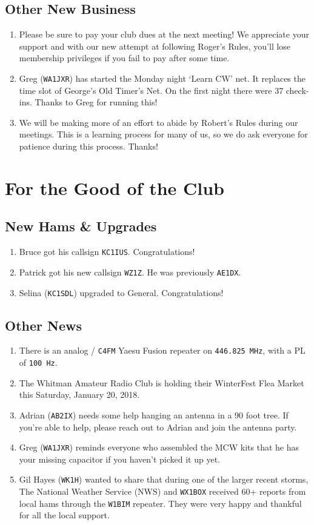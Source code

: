 \documentclass[10pt,letterpaper]{article}
\begin{document}
\subsection{Other New Business}
\begin{enumerate}
  \item Please be sure to pay your club dues at the next meeting! We appreciate your support and with our new attempt at following Roger's Rules, you'll lose membership privileges if you fail to pay after some time.
  \item Greg (\texttt{WA1JXR}) has started the Monday night `Learn CW' net. It replaces the time slot of George's Old Timer's Net. On the first night there were 37 check-ins. Thanks to Greg for running this!
  \item We will be making more of an effort to abide by Robert's Rules during our meetings. This is a learning process for many of us, so we do ask everyone for patience during this process. Thanks!
\end{enumerate}

\section{For the Good of the Club}

\subsection{New Hams \& Upgrades}
\begin{enumerate}
  \item Bruce got his callsign \texttt{KC1IUS}. Congratulations!
  \item Patrick got his new callsign \texttt{WZ1Z}. He was previously \texttt{AE1DX}.
  \item Selina (\texttt{KC1SDL}) upgraded to General. Congratulations!
\end{enumerate}

\subsection{Other News}
\begin{enumerate}
  \item There is an analog / \texttt{C4FM} Yaesu Fusion repeater on \texttt{446.825 MHz}, with a PL of \texttt{100 Hz}.
  \item The Whitman Amateur Radio Club is holding their WinterFest Flea Market this Saturday, January 20, 2018.
  \item Adrian (\texttt{AB2IX}) needs some help hanging an antenna in a 90 foot tree. If you're able to help, please reach out to Adrian and join the antenna party.
  \item Greg (\texttt{WA1JXR}) reminds everyone who assembled the MCW kits that he has your missing capacitor if you haven't picked it up yet.
  \item Gil Hayes (\texttt{WK1H}) wanted to share that during one of the larger recent storms, The National Weather Service (NWS) and \texttt{WX1BOX} received 60+ reports from local hams through the \texttt{W1BIM} repeater. They were very happy and thankful for all the local support.
\end{enumerate}
\end{document}
